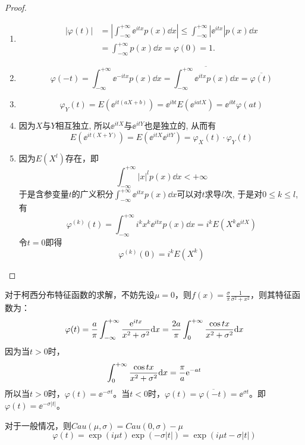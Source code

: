 \begin{proof}
    \begin{enumerate}
        \item
              \begin{align*}
                  |\varphi(t)| & = \left\lvert \int_{-\infty}^{+\infty} \ee^{itx} p(x) \dd x \right\rvert
                  \leq \int_{-\infty}^{+\infty} \left\lvert \ee^{itx} \right\rvert p(x) \dd x             \\
                               & = \int_{-\infty}^{+\infty} p(x) \dd x
                  = \varphi(0)
                  = 1.
              \end{align*}
        \item
              \[ \varphi(-t) = \int_{-\infty}^{+\infty} \ee^{-itx} p(x) \dd x
                  = \overline{\int_{-\infty}^{+\infty} \ee^{itx} p(x) \dd x}
                  = \overline{\varphi(t)} \]
        \item
              \[ \varphi_Y(t) = E(\ee^{it(aX + b)})
                  = \ee^{ibt} E(\ee^{iatX}) = \ee^{ibt} \varphi(at) \]
        \item 因为$X$与$Y$相互独立, 所以$\ee^{itX}$与$\ee^{itY}$也是独立的, 从而有
              \[ E \left(\ee^{it(X + Y)} \right) = E \left(\ee^{itX} \ee^{itY} \right) = \varphi_X(t) \cdot \varphi_Y(t) \]
        \item 因为$E \left(X^l \right)$存在，即
              \[ \int_{-\infty}^{+\infty} \lvert x \rvert^l p(x) \dd x < +\infty \]
              于是含参变量$t$的广义积分$\int_{-\infty}^{+\infty} \ee^{itx} p(x) \dd x$可以对$t$求导$l$次, 于是对$0 \leq k \leq l$, 有
              \[ \varphi ^{(k)}(t) = \int_{-\infty}^{+\infty} i^k x^k \ee^{itx} p(x) \dd x = i^k E \left(X^k \ee^{itX} \right) \]
              令$t = 0$即得
              \[ \varphi^{(k)}(0) = i^k E \left(X^k \right) \]
    \end{enumerate}
\end{proof}

\begin{example}[柯西分布的特征函数]\label{ex:Cauchy_dist_chf}
    对于柯西分布特征函数的求解，不妨先设$\mu=0$，则$f(x) = \frac{\sigma}{\pi} \frac1{\sigma^2+x^2}$，则其特征函数为：
    \[ \varphi(t)=\frac{a}{\pi}\int_{-\infty}^{+\infty} \frac{\mathrm e^{itx}}{x^2+\sigma^2} \mathrm{d} x = \frac{2a}{\pi}\int_{0}^{+\infty} \frac{\cos t x}{x^2+\sigma^2} \mathrm{d} x \]
    因为当$t>0$时，
    \[ \int_{0}^{+\infty} \frac{\cos t x}{x^2+\sigma^2} \mathrm{d} x = \frac{\pi}{a} \mathrm e^{-at} \]
    所以当$t>0$时，$\varphi(t)=\ee^{-\sigma t}$。当$t<0$时，$\varphi(t)=\overline{\varphi(-t)}=\ee^{\sigma t}$。即$\varphi(t)=\ee^{-\sigma |t|}$。

    对于一般情况，则$Cau(\mu,\sigma)=Cau(0,\sigma)-\mu$
    \[ \varphi(t)=\exp (i\mu t) \exp(-\sigma |t|)=\exp (i\mu t-\sigma |t|) \]
\end{example}

